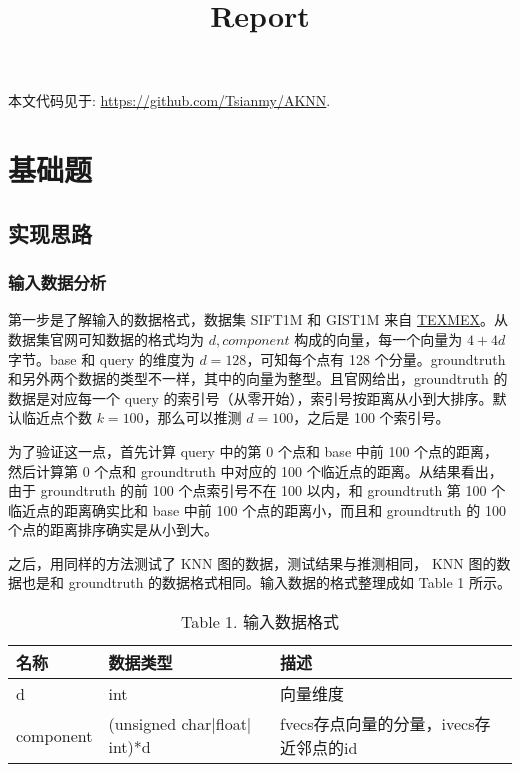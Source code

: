 \documentclass{article}
\title{Report}
\date{}
\begin{document}
\maketitle

本文代码见于: \url{https://github.com/Tsianmy/AKNN}.

\section{基础题}

\subsection{实现思路}

\subsubsection*{输入数据分析}
第一步是了解输入的数据格式，数据集 SIFT1M 和 GIST1M 来自 \href{http://corpus-texmex.irisa.fr/}{TEXMEX}。从数据集官网可知数据的格式均为 $d, component$ 构成的向量，每一个向量为 $4 + 4d$ 字节。base 和 query 的维度为 $d = 128$，可知每个点有 128 个分量。groundtruth 和另外两个数据的类型不一样，其中的向量为整型。且官网给出，groundtruth 的数据是对应每一个 query 的索引号（从零开始），索引号按距离从小到大排序。默认临近点个数 $k = 100$，那么可以推测 $d = 100$，之后是 100 个索引号。

为了验证这一点，首先计算 query 中的第 0 个点和 base 中前 100 个点的距离，然后计算第 0 个点和 groundtruth 中对应的 100 个临近点的距离。从结果看出，由于 groundtruth 的前 100 个点索引号不在 100 以内，和 groundtruth 第 100 个临近点的距离确实比和 base 中前 100 个点的距离小，而且和 groundtruth 的 100 个点的距离排序确实是从小到大。

之后，用同样的方法测试了 KNN 图的数据，测试结果与推测相同， KNN 图的数据也是和 groundtruth 的数据格式相同。输入数据的格式整理成如 Table 1 所示。

\begin{table}[h]
\caption*{Table 1. 输入数据格式}
\centering
\small
\begin{tabular}{@{}lll@{}}
	\toprule
	名称        & 数据类型                            & 描述                             \\ \midrule
	d         & int                             & 向量维度                           \\
	component & (unsigned char$|$float$|$int)*d & fvecs存点向量的分量，ivecs存近邻点的id \\ \bottomrule
\end{tabular}
\end{table}
\end{document}
